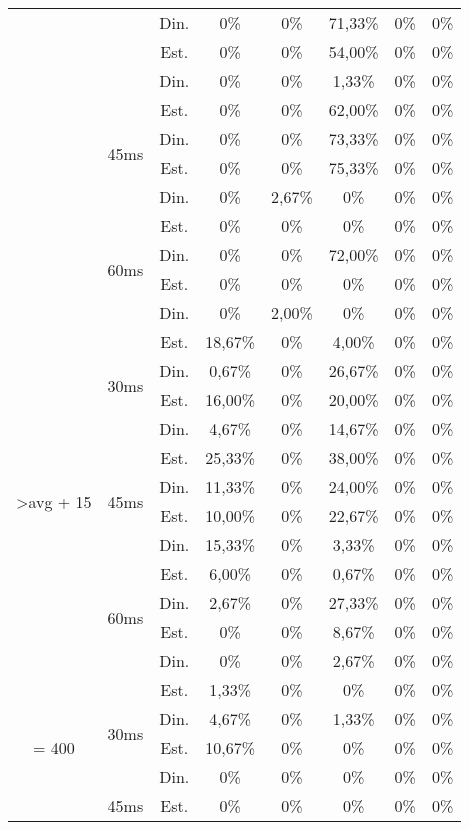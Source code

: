 \begin{center}
\begin{longtable}{|c|c|c|ccccc|}
 &  & Din. &0\% &0\% & 71,33\% &0\% &0\% \\
 &  & Est. &0\% &0\% & 54,00\% &0\% &0\% \\
 &  & Din. &0\% &0\% & 1,33\% &0\% &0\% \\ \cline{2-8} 
 & \multirow{4}{*}{45ms} & Est. &0\% &0\% & 62,00\% &0\% &0\% \\
 &  & Din. &0\% &0\% & 73,33\% &0\% &0\% \\
 &  & Est. &0\% &0\% & 75,33\% &0\% &0\% \\
 &  & Din. &0\% & 2,67\% &0\% &0\% &0\% \\ \cline{2-8} 
 & \multirow{4}{*}{60ms} & Est. &0\% &0\% &0\% &0\% &0\% \\
 &  & Din. &0\% &0\% & 72,00\% &0\% &0\% \\
 &  & Est. &0\% &0\% &0\% &0\% &0\% \\
 &  & Din. &0\% & 2,00\% &0\% &0\% &0\% \\ \hline
\multirow{12}{*}{\textgreater avg + 15} & \multirow{4}{*}{30ms} & Est. & 18,67\% &0\% & 4,00\% &0\% &0\% \\
 &  & Din. & 0,67\% &0\% & 26,67\% &0\% &0\% \\
 &  & Est. & 16,00\% &0\% & 20,00\% &0\% &0\% \\
 &  & Din. & 4,67\% &0\% & 14,67\% &0\% &0\% \\ \cline{2-8} 
 & \multirow{4}{*}{45ms} & Est. & 25,33\% &0\% & 38,00\% &0\% &0\% \\
 &  & Din. & 11,33\% &0\% & 24,00\% &0\% &0\% \\
 &  & Est. & 10,00\% &0\% & 22,67\% &0\% &0\% \\
 &  & Din. & 15,33\% &0\% & 3,33\% &0\% &0\% \\ \cline{2-8} 
 & \multirow{4}{*}{60ms} & Est. & 6,00\% &0\% & 0,67\% &0\% &0\% \\
 &  & Din. & 2,67\% &0\% & 27,33\% &0\% &0\% \\
 &  & Est. &0\% &0\% & 8,67\% &0\% &0\% \\
 &  & Din. &0\% &0\% & 2,67\% &0\% &0\% \\ \hline
\multirow{12}{*}{= 400} & \multirow{4}{*}{30ms} & Est. & 1,33\% &0\% &0\% &0\% &0\% \\
 &  & Din. & 4,67\% &0\% & 1,33\% &0\% &0\% \\
 &  & Est. & 10,67\% &0\% &0\% &0\% &0\% \\
 &  & Din. &0\% &0\% &0\% &0\% &0\% \\ \cline{2-8} 
 & \multirow{4}{*}{45ms} & Est. &0\% &0\% &0\% &0\% &0\% \\

\end{longtable}
\end{center}

